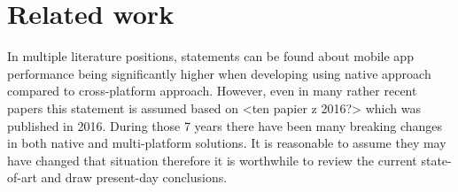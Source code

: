 
\chapter{Related work}

In multiple literature positions, statements can be found about mobile app performance being significantly higher when developing using native approach compared to cross-platform approach. However, even in many rather recent papers this statement is assumed based on <ten papier z 2016?> which was published in 2016. During those 7 years there have been many breaking changes in both native and multi-platform solutions. It is reasonable to assume they may have changed that situation therefore it is worthwhile to review the current state-of-art and draw present-day conclusions.


